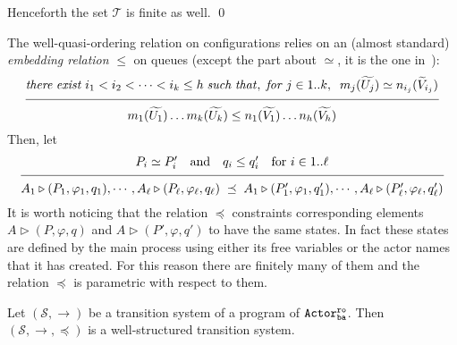 \documentclass{LMCS}
\newcommand{\cal}{\mathcal}
\theoremstyle{plain}\newtheorem{proposition}[thm]{Proposition}
\theoremstyle{plain}\newtheorem{lemma}[thm]{Lemma}
\theoremstyle{plain}\newtheorem{theorem}[thm]{Theorem}
\theoremstyle{plain}\newtheorem{corollary}[thm]{Corollary}
\newcommand{\bigfract}[2]{\frac{^{\textstyle #1}}{_{\textstyle #2}}}
\newcommand{\lred}[1]{\stackrel{#1}{\longrightarrow}}
\newcommand{\wt}[1]{\widetilde{#1}}
\newcommand{\actroba}{${\tt Actor^{\tt ro}_{\tt ba}}$}
\begin{document}
Henceforth the set ${\cal T}$ is finite as well.
\qed
\fi


The well-quasi-ordering relation on configurations relies on an (almost standard) 
\emph{embedding relation} $\leq$ on queues (except the part about $\simeq$, it 
is the one in~\cite{Finkel:2001}):
{\small
\[
\bigfract{
	{\it there \; exist} \; i_1 < i_2 < \cdots < i_k \leq h \; 
	{\it such \; that, \; for} \; j \in 1..k,  \; \; m_j(\wt{U_j}) 
	\simeq n_{i_j}(\wt{V}_{i_j})
	}{
	m_1(\wt{U_1}) \ldots m_k(\wt{U_k}) \leq n_1(\wt{V_1}) \ldots n_h(\wt{V_h})
	}
\]
}
Then, let
{\small
\[
\bigfract{P_i \simeq P_i'\quad  \mbox{\rm and}  \quad q_i \leq q_i'\quad \mbox{\rm for } {i \in 1..\ell}
	}{
	 A_1 \triangleright (P_1, \varphi_1, q_1), \cdots , A_\ell \triangleright (P_\ell, \varphi_\ell, q_\ell) 
 \; \preceq \; A_1 \triangleright (P_1', \varphi_1, q_1'), \cdots , A_\ell \triangleright 
 (P_\ell',\varphi_\ell, q_\ell')
 }
\]
}
It is worth noticing that the relation $\preceq$ constraints corresponding
elements $A \triangleright (P, \varphi, q)$ and $A \triangleright 
(P', \varphi, q')$ to have the same states. In fact these states are defined by
the main process using either its free variables or the actor names that it
has created. For this reason there are finitely many of them and the relation
$\preceq$ is parametric with respect to them.

\begin{thm}
\label{thm.decidablestatelessandfinite}
Let $({\cal S},\lred{})$ be a transition system of a program
of {\actroba}. 
Then $({\cal S}, \lred{}, \preceq)$ is a well-structured transition system.
\end{thm}
\end{document}
